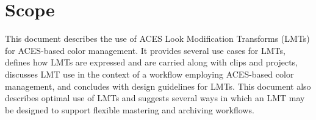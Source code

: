 \cleardoublepage
\numberedformat	
\chapter{Scope} 	%

This document describes the use of ACES Look Modification Transforms (LMTs) for ACES-based color management. It provides several use cases for LMTs, defines how LMTs are expressed and are carried along with clips and projects, discusses LMT use in the context of a workflow employing ACES-based color management, and concludes with design guidelines for LMTs. This document also describes optimal use of LMTs and suggests several ways in which an LMT may be designed to support flexible mastering and archiving workflows.